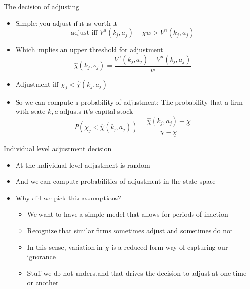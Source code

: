 \documentclass[11pt,aspectratio=169,xcolor={dvipsnames},hyperref={pdftex,pdfpagemode=UseNone,hidelinks,pdfdisplaydoctitle=true},usepdftitle=false]{beamer}
\begin{document}
\begin{frame}{The decision of adjusting}
\begin{itemize}
\item Simple: you adjust if it is worth it
$$\text{adjust iff  }  V^a(k_j,a_j)  - \chi w > V^n(k_j,a_j)$$
\item Which implies an upper threshold for adjustment
$$\hat{\chi}(k_j,a_j) =  \frac{V^a(k_j,a_j)  - V^n(k_j,a_j)}{w}  $$
\pause
\item Adjustment iff $\chi_j < \hat{\chi}(k_j,a_j)$
\item So we can compute a probability of adjustment: The probability that a firm with state $k,a$ adjusts it's capital stock
\pause
$$P(\chi_j < \hat{\chi}(k_j,a_j)) = \frac{\hat{\chi}(k_j,a_j) - \underline{\chi}}{\bar{\chi} - \underline{\chi}}$$
\end{itemize}
\end{frame}

\begin{frame}{Individual level adjustment decision}
\begin{itemize}
\item At the individual level adjustment is random
\pause
\item And we can compute probabilities of adjustment in the state-space
\pause
\item Why did we pick this assumptions?
\begin{itemize}
\item We want to have a simple model that allows for periods of inaction
\pause
\item Recognize that similar firms sometimes adjust and sometimes do not
\pause
\item In this sense, variation in $\chi$ is a reduced form way of capturing our ignorance
\pause
\item Stuff we do not understand that drives the decision to adjust at one time or another
\end{itemize}
\end{itemize}
\end{frame}
\end{document}
